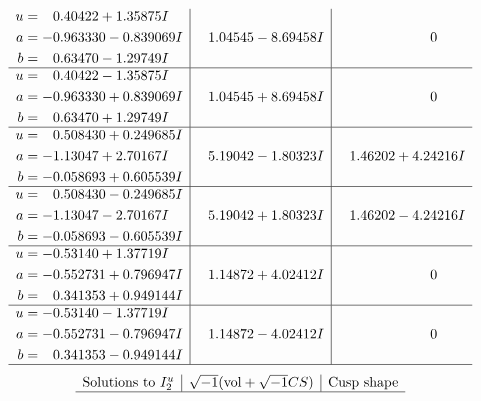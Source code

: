 \documentclass[1p]{elsarticle_modified}
\theoremstyle{definition}
\newcommand{\I}{\sqrt{-1}}
\begin{document}
$$\begin{array}{c|c|c}
\begin{aligned}
u &= \phantom{-}0.40422 + 1.35875 I \\
a &= -0.963330 - 0.839069 I \\
b &= \phantom{-}0.63470 - 1.29749 I\end{aligned}
 & \phantom{-}1.04545 - 8.69458 I & \phantom{-0.000000 } 0 \\ \hline\begin{aligned}
u &= \phantom{-}0.40422 - 1.35875 I \\
a &= -0.963330 + 0.839069 I \\
b &= \phantom{-}0.63470 + 1.29749 I\end{aligned}
 & \phantom{-}1.04545 + 8.69458 I & \phantom{-0.000000 } 0 \\ \hline\begin{aligned}
u &= \phantom{-}0.508430 + 0.249685 I \\
a &= -1.13047 + 2.70167 I \\
b &= -0.058693 + 0.605539 I\end{aligned}
 & \phantom{-}5.19042 - 1.80323 I & \phantom{-}1.46202 + 4.24216 I \\ \hline\begin{aligned}
u &= \phantom{-}0.508430 - 0.249685 I \\
a &= -1.13047 - 2.70167 I \\
b &= -0.058693 - 0.605539 I\end{aligned}
 & \phantom{-}5.19042 + 1.80323 I & \phantom{-}1.46202 - 4.24216 I \\ \hline\begin{aligned}
u &= -0.53140 + 1.37719 I \\
a &= -0.552731 + 0.796947 I \\
b &= \phantom{-}0.341353 + 0.949144 I\end{aligned}
 & \phantom{-}1.14872 + 4.02412 I & \phantom{-0.000000 } 0 \\ \hline\begin{aligned}
u &= -0.53140 - 1.37719 I \\
a &= -0.552731 - 0.796947 I \\
b &= \phantom{-}0.341353 - 0.949144 I\end{aligned}
 & \phantom{-}1.14872 - 4.02412 I & \phantom{-0.000000 } 0\\
 \hline 
 \end{array}$$\newpage$$\begin{array}{c|c|c}  
\text{Solutions to }I^u_{2}& \I (\text{vol} + \sqrt{-1}CS) & \text{Cusp shape}\\
 \hline 

\end{array}$$
\end{document}
